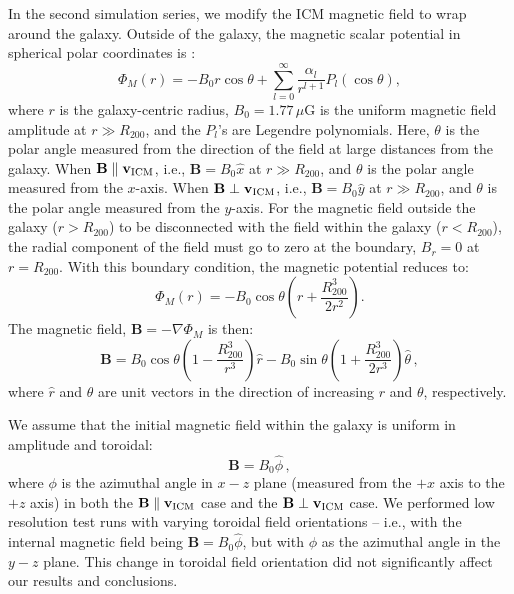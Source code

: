 \documentclass[twocolumn]{aastex6}
\newcommand{\muG}{\, \mu\mbox{G}}
\begin{document}
In the second simulation series, we modify the ICM magnetic field to wrap around the galaxy. Outside of the galaxy, the magnetic scalar potential in spherical polar coordinates is
\citep[][\S 5.12]{Jackson99}:
\begin{equation}
\Phi_M(r) = -B_0 r \cos \theta + \sum_{l = 0}^{\infty} \frac{\alpha_l}{r^{l+1}}P_l(\cos \theta),
\end{equation}
where $r$ is the galaxy-centric radius,
$B_0 = 1.77 \muG$ is the uniform magnetic field amplitude at $r \gg R_{200}$,
and the $P_l$'s are Legendre polynomials.
Here, $\theta$ is the polar angle measured from the direction of the field at large distances from the galaxy. When $\mathbf{B} \parallel \mathbf{v_{\rm ICM}}$, i.e., $\mathbf{B} = B_0 \hat{x}$ at $r \gg R_{200}$, and $\theta$ is the polar angle measured from the $x$-axis. When $\mathbf{B} \perp \mathbf{v_{\rm ICM}}$, i.e., $\mathbf{B} = B_0 \hat{y}$ at $r \gg R_{200}$, and $\theta$ is the polar angle measured from the $y$-axis. 
For the magnetic field outside the galaxy ($r > R_{200}$) to be disconnected with the field within the galaxy ($r < R_{200}$), the radial component of the field must go to zero at the boundary, $B_r = 0$ at $r = R_{200}$.
With this boundary condition,  the magnetic potential reduces to:
\begin{equation}
\Phi_M(r) = -B_0 \cos \theta \left(r + \frac{R_{200}^3}{2r^2}\right).
\end{equation}
The magnetic field, $\mathbf{B} = - \nabla \Phi_M$ is then:
\begin{equation}
\mathbf{B} = B_0 \cos \theta \left(1 - \frac{R_{200}^3}{r^3}\right) \hat{r} - B_0 \sin \theta \left(1 + \frac{R_{200}^3}{2 r^3}\right) \hat{\theta} \, ,
\end{equation}
where $\hat{r}$ and $\hat{\theta}$ are unit vectors in the direction of increasing $r$ and $\theta$, respectively.

We assume that the initial magnetic field within the galaxy is uniform in amplitude and toroidal:
\begin{equation}
\mathbf{B} = B_0 \hat{\phi} \, ,
\end{equation}
where $\phi$ is the azimuthal angle in $x-z$ plane
(measured from the $+x$ axis to the $+z$ axis)
in both the $\mathbf{B} \parallel \mathbf{v_{\rm ICM}}$ case and the $\mathbf{B} \perp \mathbf{v_{\rm ICM}}$ case. We performed low resolution test runs with varying toroidal field orientations -- i.e., with the internal magnetic field being $\mathbf{B} = B_0 \hat{\phi} $, but with $\phi$ as the azimuthal angle in the $y-z$ plane. This change in toroidal field orientation did not significantly affect our results and conclusions.
\end{document}
